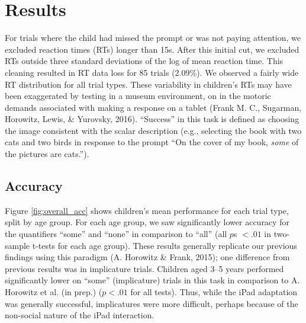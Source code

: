 \documentclass[10pt, letterpaper]{article}
\begin{document}
\section{Results}\label{results}

For trials where the child had missed the prompt or was not paying
attention, we excluded reaction times (RTs) longer than 15s. After this
initial cut, we excluded RTs outside three standard deviations of the
log of mean reaction time. This cleaning resulted in RT data loss for 85
trials (2.09\%). We observed a fairly wide RT distribution for all trial
types. These variability in children's RTs may have been exaggerated by
testing in a museum environment, on in the motoric demands associated
with making a response on a tablet (Frank M. C., Sugarman, Horowitz,
Lewis, \& Yurovsky, 2016). ``Success'' in this task is defined as
choosing the image consistent with the scalar description (e.g.,
selecting the book with two cats and two birds in response to the prompt
``On the cover of my book, \emph{some} of the pictures are cats.'').

\subsection{Accuracy}\label{accuracy}

Figure \ref{fig:overall_acc} shows children's mean performance for each
trial type, split by age group. For each age group, we saw significantly
lower accuracy for the quantifiers ``some'' and ``none'' in comparison
to ``all'' (all \(p\)s \(< .01\) in two-sample t-tests for each age
group). These results generally replicate our previous findings using
this paradigm (A. Horowitz \& Frank, 2015); one difference from previous
results was in implicature trials. Children aged 3--5 years performed
significantly lower on ``some'' (implicature) trials in this task in
comparison to A. Horowitz et al. (in prep.) (\(p < .01\) for all tests).
Thus, while the iPad adaptation was generally successful, implicatures
were more difficult, perhaps because of the non-social nature of the
iPad interaction.
\end{document}
